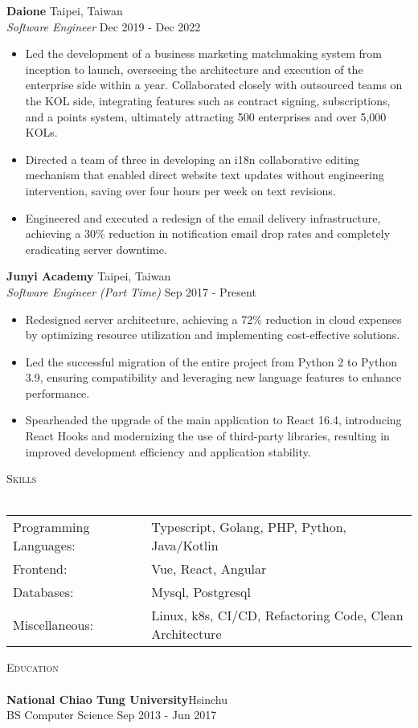 \documentclass[a4paper]{article}
\newcommand{\lineunder} {
    \vspace*{-8pt} \\
    \hspace*{-18pt} \hrulefill \\
}
\newcommand{\header} [1] {
        {\hspace*{-18pt}\vspace*{6pt} \textsc{#1}}
    \vspace*{-6pt} \lineunder
}
\begin{document}
    \textbf{Daione} \hfill Taipei, Taiwan\\
    \textit{Software Engineer} \hfill Dec 2019 - Dec 2022\\
    \vspace{-1mm}
    \begin{itemize} \itemsep 1pt
    \item Led the development of a business marketing matchmaking system from inception to launch, overseeing the architecture and execution of the enterprise side within a year.
    Collaborated closely with outsourced teams on the KOL side, integrating features such as contract signing, subscriptions, and a points system, ultimately attracting 500 enterprises and over 5,000 KOLs.
    \item Directed a team of three in developing an i18n collaborative editing mechanism that enabled direct website text updates without engineering intervention, saving over four hours per week on text revisions.
    \item Engineered and executed a redesign of the email delivery infrastructure, achieving a 30\% reduction in notification email drop rates and completely eradicating server downtime.
    \end{itemize}
    \textbf{Junyi Academy} \hfill Taipei, Taiwan\\
    \textit{Software Engineer (Part Time)} \hfill Sep 2017 - Present\\
    \vspace{-1mm}
    \begin{itemize} \itemsep 1pt
    \item Redesigned server architecture, achieving a 72\% reduction in cloud expenses by optimizing resource utilization and implementing cost-effective solutions.
    \item Led the successful migration of the entire project from Python 2 to Python 3.9, ensuring compatibility and leveraging new language features to enhance performance.
    \item Spearheaded the upgrade of the main application to React 16.4, introducing React Hooks and modernizing the use of third-party libraries, resulting in improved development efficiency and application stability.
    \end{itemize}

    \header{Skills}
    \begin{tabular}{ l l }
        Programming Languages: & Typescript, Golang, PHP, Python, Java/Kotlin            \\
        Frontend:              & Vue, React, Angular                                     \\
        Databases:             & Mysql, Postgresql                                       \\
        Miscellaneous:         & Linux, k8s, CI/CD, Refactoring Code, Clean Architecture \\
    \end{tabular}
    \vspace{2mm}



    \header{Education}
    \textbf{National Chiao Tung University}\hfill Hsinchu\\
    BS Computer Science \hfill Sep 2013 - Jun 2017\\
    \vspace{2mm}



    \
\end{document}
